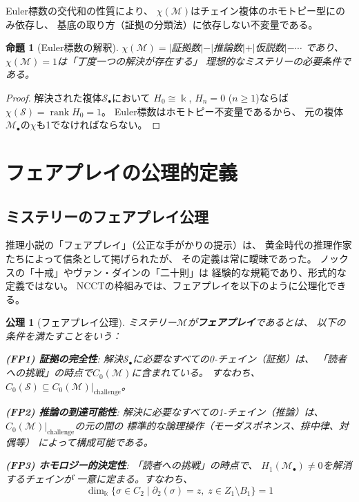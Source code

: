 \documentclass[12pt,twocolumn]{ltjsarticle}
\newtheorem{proposition}[theorem]{命題}
\newtheorem{axiom}[theorem]{公理}
\renewcommand{\rank}{\operatorname{rank}}
\newcommand{\Mys}{\mathcal{M}}
\newcommand{\Sol}{\mathcal{S}}
\newcommand{\kk}{\Bbbk}
\begin{document}
Euler標数の交代和の性質により、
$\chi(\Mys)$はチェイン複体のホモトピー型にのみ依存し、
基底の取り方（証拠の分類法）に依存しない不変量である。

\begin{proposition}[Euler標数の解釈]
$\chi(\Mys) = |$証拠数$| - |$推論数$| + |$仮説数$| - \cdots$
であり、
$\chi(\Mys) = 1$は「丁度一つの解決が存在する」
理想的なミステリーの必要条件である。
\end{proposition}

\begin{proof}
解決された複体$\Sol_\bullet$において
$H_0 \cong \kk$, $H_n = 0$ ($n \geq 1$)ならば
$\chi(\Sol) = \rank H_0 = 1$。
Euler標数はホモトピー不変量であるから、
元の複体$\Mys_\bullet$の$\chi$も1でなければならない。
\end{proof}


\section{フェアプレイの公理的定義}
\label{sec:fairplay}

\subsection{ミステリーのフェアプレイ公理}

推理小説の「フェアプレイ」（公正な手がかりの提示）は、
黄金時代の推理作家たちによって信条として掲げられたが、
その定義は常に曖昧であった。
ノックスの「十戒」やヴァン・ダインの「二十則」は
経験的な規範であり、形式的な定義ではない。
NCCTの枠組みでは、フェアプレイを以下のように公理化できる。

\begin{axiom}[フェアプレイ公理]
\label{ax:fairplay}
ミステリー$\Mys$が\textbf{フェアプレイ}であるとは、
以下の条件を満たすことをいう：

\textbf{(FP1) 証拠の完全性}:
解決$\Sol_\bullet$に必要なすべての0-チェイン（証拠）は、
「読者への挑戦」の時点で$C_0(\Mys)$に含まれている。
すなわち、$C_0(\Sol) \subseteq C_0(\Mys)|_{\text{challenge}}$。

\textbf{(FP2) 推論の到達可能性}:
解決に必要なすべての1-チェイン（推論）は、
$C_0(\Mys)|_{\text{challenge}}$の元の間の
標準的な論理操作（モーダスポネンス、排中律、対偶等）
によって構成可能である。

\textbf{(FP3) ホモロジー的決定性}:
「読者への挑戦」の時点で、
$H_1(\Mys_\bullet) \neq 0$を解消するチェインが
一意に定まる。すなわち、
\begin{equation}
\dim_\kk \{ \sigma \in C_2 \mid \partial_2(\sigma) = z,\;
z \in Z_1 \setminus B_1 \} = 1
\end{equation}
\end{axiom}
\end{document}
